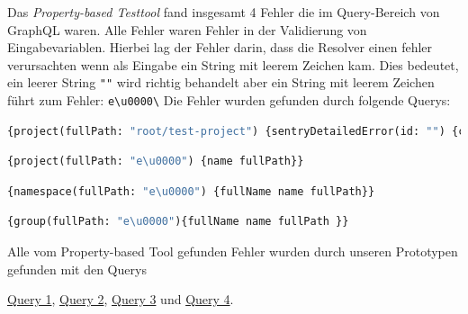 Das \textit{Property-based Testtool} fand insgesamt 4 Fehler die im Query-Bereich von GraphQL waren.
Alle Fehler waren Fehler in der Validierung von Eingabevariablen.
Hierbei lag der Fehler darin, dass die Resolver einen fehler verursachten wenn als Eingabe ein String mit leerem Zeichen kam.
Dies bedeutet, ein leerer String \verb+""+ wird richtig behandelt aber ein String mit leerem Zeichen führt zum Fehler: \verb+e\u0000\+
Die Fehler wurden gefunden durch folgende Querys:

\begin{lstlisting}[language=GraphQL, caption=Fehler 1\cite{issue1}]
{project(fullPath: "root/test-project") {sentryDetailedError(id: "") {count}}}
\end{lstlisting}

\begin{lstlisting}[language=GraphQL, caption=Fehler 2\cite{issue2}]
{project(fullPath: "e\u0000") {name fullPath}}
\end{lstlisting}

\begin{lstlisting}[language=GraphQL, caption=Fehler 3\cite{issue3}]
{namespace(fullPath: "e\u0000") {fullName name fullPath}}
\end{lstlisting}

\begin{lstlisting}[language=GraphQL, caption=Fehler 4\cite{issue4}]
{group(fullPath: "e\u0000"){fullName name fullPath }}
\end{lstlisting}

Alle vom Property-based Tool gefunden Fehler wurden durch unseren Prototypen gefunden mit den Querys

\hyperref[query1]{Query 1},
\hyperref[query2]{Query 2},
\hyperref[query3]{Query 3} und
\hyperref[query4]{Query 4}.

